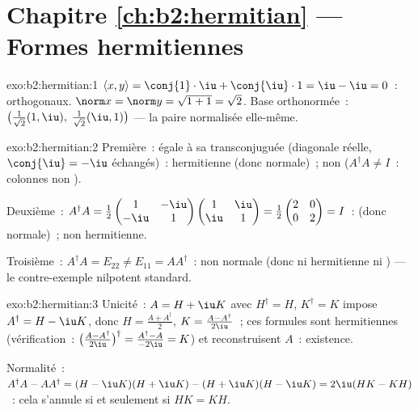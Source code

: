 \section*{Chapitre \ref{ch:b2:hermitian} --- Formes hermitiennes}

\begin{solution}{exo:b2:hermitian:1}
$\langle x, y\rangle = \conj{1}\cdot\iu + \conj{\iu}\cdot 1 = \iu -
\iu = 0$~: orthogonaux. $\norm x = \norm y = \sqrt{1 + 1} = \sqrt2$.
Base orthonormée~: $\bigl(\frac{1}{\sqrt2}(1, \iu),\;
\frac{1}{\sqrt2}(\iu, 1)\bigr)$ --- la paire normalisée elle-même.
\end{solution}

\begin{solution}{exo:b2:hermitian:2}
Première~: égale à sa transconjuguée (diagonale réelle, $\conj{\iu} =
-\iu$ échangés)~: hermitienne (donc normale)~; non  ($A^\dagger A
\neq I$~: colonnes non ).

Deuxième~: $A^\dagger A = \frac12\begin{pmatrix} 1 & -\iu\\ -\iu &
1\end{pmatrix}\begin{pmatrix} 1 & \iu\\ \iu & 1\end{pmatrix} =
\frac12\begin{pmatrix} 2 & 0\\ 0 & 2\end{pmatrix} = I$~: 
(donc normale)~; non hermitienne.

Troisième~: $A^\dagger A = E_{22} \neq E_{11} = AA^\dagger$~: non normale
(donc ni hermitienne ni ) --- le contre-exemple nilpotent
standard.
\end{solution}

\begin{solution}{exo:b2:hermitian:3}
Unicité~: $A = H + \iu K$ avec $H^\dagger = H$, $K^\dagger = K$
impose $A^\dagger = H - \iu K$, donc $H = \frac{A + A^\dagger}{2}$,
$K = \frac{A - A^\dagger}{2\iu}$~; ces formules sont hermitiennes
(vérification~: $\bigl(\frac{A - A^\dagger}{2\iu}\bigr)^\dagger = \frac{
A^\dagger - A}{-2\iu} = K$) et reconstruisent $A$~: existence.

Normalité~: $A^\dagger A - AA^\dagger = (H - \iu K)(H + \iu K) - (H
+ \iu K)(H - \iu K) = 2\iu(HK - KH)$~: cela s'annule si et seulement
si $HK = KH$.
\end{solution}

